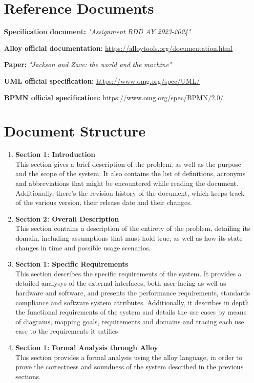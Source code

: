 \section{Reference Documents}

\begin{description}[labelwidth=4em, leftmargin=5em, style=nextline]
    \item \textbf{Specification document:} \emph{"Assignment RDD AY 2023-2024"}
    \item \textbf{Alloy official documentation:} \url{https://alloytools.org/documentation.html}
    \item \textbf{Paper:} \emph{"Jackson and Zave: the world and the machine"}
    \item \textbf{UML official specification:} \url{https://www.omg.org/spec/UML/}
    \item \textbf{BPMN official specification:} \url{https://www.omg.org/spec/BPMN/2.0/}
\end{description}


\section{Document Structure}

\begin{enumerate}
    \item \textbf{Section 1: Introduction} \\
          This section gives a brief description of the problem, as well as the purpose and the scope of
          the system.
          It also contains the list of definitions, acronyms and abbreviations that might be encountered
          while reading the document.
          Additionally, there's the revision history of the document, which keeps track of the various
          version, their release date and their changes.
    \item \textbf{Section 2: Overall Description} \\
          This section contains a description of the entirety of the problem, detailing its domain,
          including assumptions that must hold true, as well as how its state changes in time
          and possible usage scenarios.
    \item \textbf{Section 1: Specific Requirements} \\
          This section describes the specific requirements of the system. It provides a detailed analysys
          of the external interfaces, both user-facing as well as hardware and software, and presents the
          performance requirements, standards compliance and software system attributes.
          Additionally, it describes in depth the functional requirements of the system and details the
          use cases by means of diagrams, mapping goals, requirements and domains and tracing each use
          case to the requirements it satifies
    \item \textbf{Section 1: Formal Analysis through Alloy} \\
          This section provides a formal analysis using the alloy language, in order
          to prove the correctness and soundness of the system described in the previous sections.
\end{enumerate}